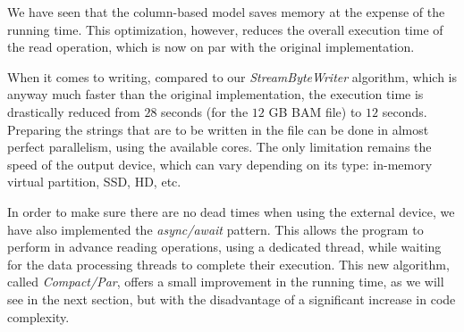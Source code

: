 \documentclass[a4paper,twoside]{article}
\begin{document}
We have seen that the column-based model saves memory at the expense of the running time.
This optimization, however, reduces the overall execution time of the read operation, which is now on par with the original implementation.

When it comes to writing, compared to our {\it StreamByteWriter} algorithm, which is anyway much faster than the original implementation, the execution time is drastically reduced from $28$ seconds (for the $12$ GB BAM file) to $12$ seconds.
Preparing the strings that are to be written in the file can be done in almost perfect parallelism, using the available cores.
The only limitation remains the speed of the output device, which can vary depending on its type: in-memory virtual partition, SSD, HD, etc.
	
In order to make sure there are no dead times when using the external device, 
we have also implemented the {\textit{async/await}} pattern.
This allows the program to perform in advance reading operations, using a dedicated thread, while waiting for the data processing threads to complete their execution.
This new algorithm, called {\textit{Compact/Par}}, offers a small improvement in the running time, as we will see in the next section, but with the disadvantage of a significant increase in code complexity.
\end{document}
